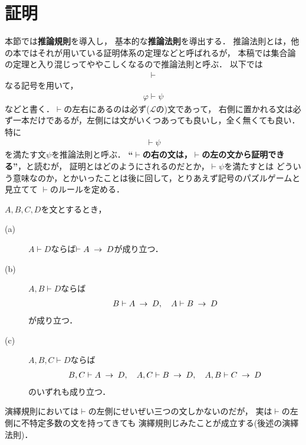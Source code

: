 \section{証明}
	本節では{\bf 推論規則}を導入し，
	基本的な{\bf 推論法則}を導出する．
	推論法則とは，他の本ではそれが用いている証明体系の定理などと呼ばれるが，
	本稿では集合論の定理と入り混じってややこしくなるので推論法則と呼ぶ．
	以下では
	\begin{align}
		\vdash
	\end{align}
	なる記号を用いて，
	\begin{align}
		\varphi \vdash \psi
	\end{align}
	などと書く．$\vdash$の左右にあるのは必ず($\mathcal{L}$の)文であって，
	右側に置かれる文は必ず一本だけであるが，左側には文がいくつあっても良いし，全く無くても良い．
	特に
	\begin{align}
		\vdash \psi
	\end{align}
	を満たす文$\psi$を推論法則と呼ぶ．
	{\bf ``$\vdash$の右の文は，$\vdash$の左の文から証明できる''}，と読むが，
	証明とはどのようにされるのだとか，$\vdash \psi$を満たすとは
	どういう意味なのか，とかいったことは後に回して，とりあえず記号のパズルゲームと見立てて
	$\vdash$のルールを定める．
	
	\begin{screen}
		\begin{logicalaxm}[演繹規則]
			$A,B,C,D$を文とするとき，
			\begin{description}
				\item[(a)] $A \vdash D$ならば$\vdash A \hspace{0.25em}\rightarrow\hspace{0.25em} D$が成り立つ．
				\item[(b)] $A,B \vdash D$ならば
					\begin{align}
						B \vdash A \hspace{0.25em}\rightarrow\hspace{0.25em} D,\quad
						A \vdash B \hspace{0.25em}\rightarrow\hspace{0.25em} D
					\end{align}
					が成り立つ．
				\item[(c)] $A,B,C \vdash D$ならば
					\begin{align}
						B,C \vdash A \hspace{0.25em}\rightarrow\hspace{0.25em} D,\quad
						A,C \vdash B \hspace{0.25em}\rightarrow\hspace{0.25em} D,\quad
						A,B \vdash C \hspace{0.25em}\rightarrow\hspace{0.25em} D
					\end{align}
					のいずれも成り立つ．
			\end{description}
		\end{logicalaxm}
	\end{screen}
	
	演繹規則においては$\vdash$の左側にせいぜい三つの文しかないのだが，
	実は$\vdash$の左側に不特定多数の文を持ってきても
	演繹規則じみたことが成立する(後述の演繹法則)．
	
